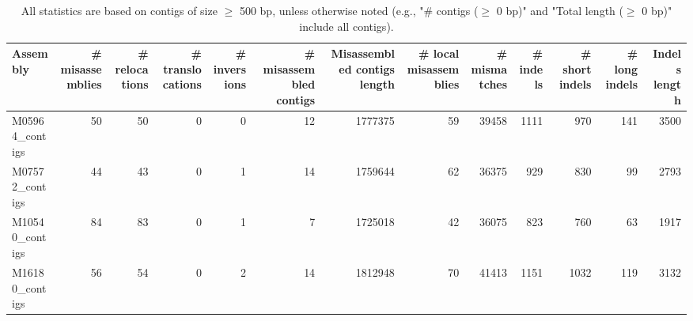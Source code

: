 \documentclass[12pt,a4paper]{article}
\begin{document}
\begin{table}[ht]
\begin{center}
\caption{All statistics are based on contigs of size $\geq$ 500 bp, unless otherwise noted (e.g., "\# contigs ($\geq$ 0 bp)" and "Total length ($\geq$ 0 bp)" include all contigs).}
\begin{tabular}{|l*{12}{|r}|}
\hline
Assembly & \# misassemblies &     \# relocations &     \# translocations &     \# inversions & \# misassembled contigs & Misassembled contigs length & \# local misassemblies & \# mismatches & \# indels &     \# short indels &     \# long indels & Indels length \\ \hline
M05964\_contigs & 50 & 50 & 0 & 0 & 12 & 1777375 & 59 & 39458 & 1111 & 970 & 141 & 3500 \\ \hline
M07572\_contigs & 44 & 43 & 0 & 1 & 14 & 1759644 & 62 & 36375 & 929 & 830 & 99 & 2793 \\ \hline
M10540\_contigs & 84 & 83 & 0 & 1 & 7 & 1725018 & 42 & 36075 & 823 & 760 & 63 & 1917 \\ \hline
M16180\_contigs & 56 & 54 & 0 & 2 & 14 & 1812948 & 70 & 41413 & 1151 & 1032 & 119 & 3132 \\ \hline
\end{tabular}
\end{center}
\end{table}
\end{document}
